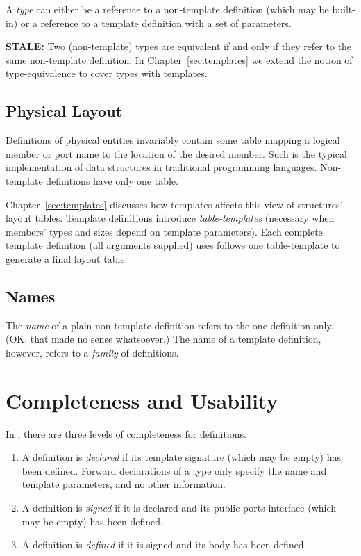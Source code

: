A \emph{type} can either be a reference to a non-template definition
(which may be built-in) or a reference to a template definition
with a set of parameters.  

\textbf{STALE:}
Two (non-template) types are equivalent if and only if 
they refer to the same non-template definition.  
In Chapter~\ref{sec:templates} we extend the notion of type-equivalence
to cover types with templates.  

\subsection{Physical Layout}
\label{sec:types:definition:layout}

Definitions of physical entities invariably contain some table mapping
a logical member or port name to the location of the desired member.  
Such is the typical implementation of data structures in traditional
programming languages.  
Non-template definitions have only one table.  

Chapter~\ref{sec:templates} discusses how templates affects this 
view of structures' layout tables.  
Template definitions introduce \emph{table-templates}
(necessary when members' types and sizes depend on template parameters).  
Each complete template definition (all arguments supplied) 
uses follows one table-template to generate a final layout table.  

\subsection{Names}
\label{sec:types:definition:name}

The \emph{name} of a plain non-template definition refers to the
one definition only.  (OK, that made no sense whatsoever.)
The name of a template definition, however, refers to a \emph{family}
of definitions.  

\section{Completeness and Usability}
\label{sec:types:completeness}

In \hac, there are three levels of completeness for definitions.  

\begin{enumerate}
\item A definition is \emph{declared}
	if its template signature (which may be empty) has been defined.  
	Forward declarations of a type only specify the name
	and template parameters, and no other information.  
\item A definition is \emph{signed} if it is declared 
	and its public ports interface (which may be empty) has been defined.  
\item A definition is \emph{defined} if it is signed
	and its body has been defined.  
\end{enumerate}

